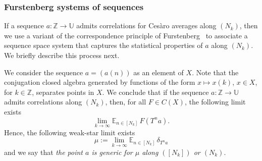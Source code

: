 \documentclass[11pt]{amsart}
\theoremstyle{definition}
\newcommand{\E}{{\mathbb E}}
\newcommand{\Z}{{\mathbb Z}}
\newcommand{\U}{{\mathbb U}}
\begin{document}
\subsubsection{Furstenberg systems of sequences}
If a sequence $a\colon \Z\to \U$   admits  correlations for Ces\`aro averages along $(N_k)$,  then we use a  variant of the correspondence principle of Furstenberg~\cite{Fu77, Fu}
to associate a sequence space  system that captures the statistical properties of $a$ along $(N_k)$. We briefly describe this process next.

We consider the sequence $a=(a(n))$ as an element of $X$. Note that  the conjugation closed algebra generated by functions of the form $x\mapsto x(k)$, $x\in X$, for   $k\in  \Z$,  separates points in $X$. We conclude that  if the
sequence $a\colon \Z\to \U$
admits   correlations  along $(N_k)$,  then,  for all $F\in C(X)$, the following limit exists
$$
\lim_{k\to\infty}\E_{n\in[N_k]}\,  F(T^na).
$$
Hence, the  following weak-star limit exists
\begin{equation}\label{uklFur}
\mu:=\lim_{k\to\infty}\E_{n\in[N_k]}\, \delta_{T^na}
\end{equation}
and we say that \emph{the point $a$ is generic for $\mu$ along $([N_k])$ or $(N_k)$}.
\end{document}

